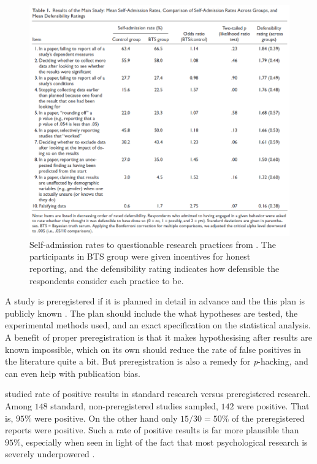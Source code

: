 \begin{figure}
\noindent \begin{centering}
\includegraphics[scale=0.4]{chunks/john2012}
\par\end{centering}
\caption{\label{fig:john2012}Self-admission rates to questionable research practices from \textcite{John2012-xp}. The participants in BTS group were given incentives for honest reporting, and the defensibility rating indicates how defensible the respondents consider each practice to be.}
\end{figure}

A study is preregistered if it is planned in detail in advance and the this plan is publicly known \parencite{Van_t_Veer2016-fo}. The plan should include the what hypotheses are tested, the experimental methods used, and an exact specification on the statistical analysis. A benefit of proper preregistration is that it makes hypothesising after results are known impossible, which on its own should reduce the rate of false positives in the literature quite a bit. But preregistration is also a remedy for \emph{p}-hacking, and can even help with publication bias.

\textcite{Scheel2020-sq} studied rate of positive results in standard research versus preregistered research. Among $148$ standard, non-preregistered studies sampled, $142$ were positive. That is, $95\%$ were positive. On the other hand only $15/30=50\%$ of the preregistered reports were positive. Such a rate of positive results is far more plausible than $95\%$, especially when seen in light of the fact that most psychological research is severely underpowered \parencite{Sedlmeier1989-zz}.

